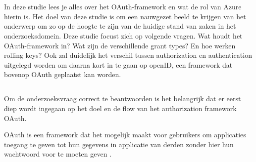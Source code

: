 \chapter{}
\label{ch:stand-van-zaken}



In deze studie lees je alles over het OAuth-framework en wat de rol van Azure hierin is. Het doel van deze studie is om een nauwgezet beeld te krijgen van het onderwerp om zo op de hoogte te zijn van de huidige stand van zaken in het onderzoeksdomein. Deze studie focust zich op volgende vragen. Wat houdt het OAuth-framework in? Wat zijn de verschillende grant types? En hoe werken rolling keys? Ook zal duidelijk het verschil tussen authorization en authentication uitgelegd worden om daarna kort in te gaan op openID, een framework dat bovenop OAuth geplaatst kan worden.
\section{}
\label{sec:OAuthFramework}
Om de onderzoeksvraag correct te beantwoorden is het belangrijk dat er eerst diep wordt ingegaan op het doel en de flow van het authorization framework OAuth.

OAuth is een framework dat het mogelijk maakt voor gebruikers om applicaties toegang te geven tot hun gegevens in applicatie van derden zonder hier hun wachtwoord voor te moeten geven \autocite{Deniss2016}.

